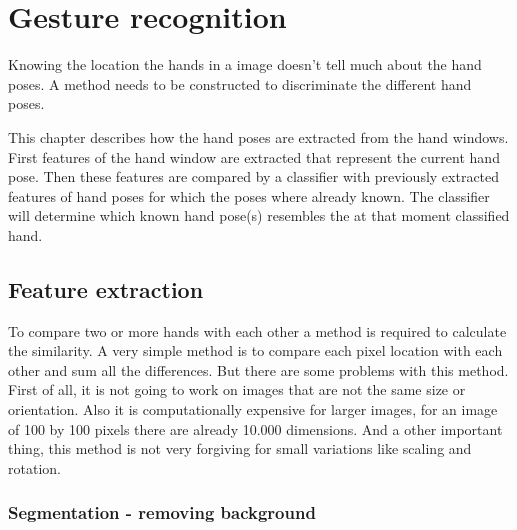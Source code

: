 
\chapter{Gesture recognition}
\label{ch:gestures}

Knowing the location the hands in a image doesn't tell much about the hand poses. A method needs to be constructed to discriminate the different hand poses. 

This chapter describes how the hand poses are extracted from the hand windows. First features of the hand window are extracted that represent the current hand pose. Then these features are compared by a classifier with previously extracted features of hand poses for which the poses where already known. The classifier will determine which known hand pose(s) resembles the at that moment classified hand.


\section{Feature extraction}
To compare two or more hands with each other a method is required to calculate the similarity. A very simple method is to compare each pixel location with each other and sum all the differences. But there are some problems with this method. First of all, it is not going to work on images that are not the same size or orientation. Also it is computationally expensive for larger images, for an image of 100 by 100 pixels there are already 10.000 dimensions. And a other important thing, this method is not very forgiving for small variations like scaling and rotation.

\subsection*{Segmentation - removing background}


